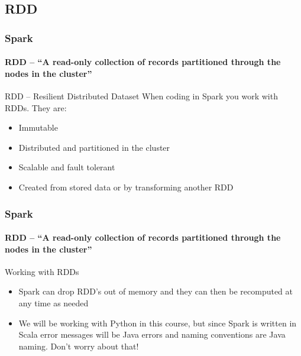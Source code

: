 \documentclass[aspectratio=169,usenames,dvipsnames]{beamer}
\begin{document}
    \subsection{RDD}
        \begin{frame}
            \frametitle{Spark}
            \framesubtitle{RDD -- ``A read-only collection of records partitioned through the nodes in the cluster''}
            \begin{block}{RDD -- Resilient Distributed Dataset}
                When coding in Spark you work with RDDs. They are:
                \begin{itemize}
                    \item \alert{Immutable}
                    \item \alert{Distributed} and \alert{partitioned} in the cluster
                    \item \alert{Scalable} and \alert{fault tolerant}
                    \item Created from stored data or by transforming another RDD
                \end{itemize}
            \end{block}
        \end{frame}

        \begin{frame}
            \frametitle{Spark}
            \framesubtitle{RDD -- ``A read-only collection of records partitioned through the nodes in the cluster''}
            \begin{block}{Working with RDDs}
                \begin{itemize}
                    \item Spark can drop RDD's out of memory and they can then be \alert{recomputed at any time} as needed
                    \item We will be working with Python in this course, but
                    since Spark is written in Scala error messages will be \alert{Java
                    errors} and naming conventions are \alert{Java naming}. \alert{Don't worry about that!}
                \end{itemize}
            \end{block}
        \end{frame}
\end{document}

